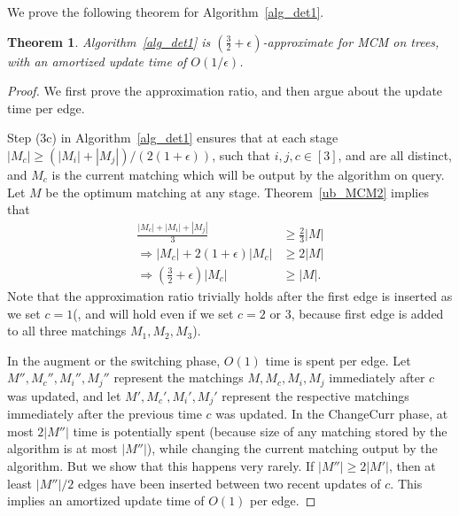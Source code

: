 \documentclass[11pt]{article}
\newtheorem{theorem}{Theorem}
\begin{document}
We prove the following theorem for Algorithm~\ref{alg_det1}.
 \begin{theorem}\label{ub_MCM3}
 Algorithm~\ref{alg_det1} is $\left(\frac{3}{2}+\epsilon\right)$-approximate for MCM on trees, with an amortized update time of $O(1/\epsilon)$.
\end{theorem}
\begin{proof}
 We first prove the approximation ratio, and then argue about the update time per edge.
 
 Step (3c) in Algorithm~\ref{alg_det1} ensures that at each stage $|M_c|\geq \left(|M_i|+|M_j|\right)/(2(1+\epsilon))$, such that $i,j,c \in [3]$, and are all distinct, and $M_c$ is the current matching which will be output by the algorithm on query. Let $M$ be the optimum matching at any stage. Theorem~\ref{ub_MCM2} implies that
 \begin{align*}
 \frac{|M_c|+|M_i|+|M_j|}{3} &\geq \frac{2}{3} |M|\\
 \Longrightarrow |M_c|+2(1+\epsilon)|M_c| &\geq 2|M|\\
 \Longrightarrow\left(\frac{3}{2}+\epsilon\right)|M_c| &\geq |M|.
 \end{align*}
 Note that the approximation ratio trivially holds after the first edge is inserted as we set $c=1$(, and will hold even if we set $c=2$ or $3$, because first edge is added to all three matchings $M_1,M_2,M_3$).
 
 In the augment or the switching phase, $O(1)$ time is spent per edge. Let $M'', M_c'',M_i'',M_j''$ represent the matchings $M,M_c,M_i,M_j$ immediately after $c$ was updated, and  let $M', M_c',M_i',M_j'$ represent the respective matchings immediately after the previous time $c$ was updated. In the ChangeCurr phase, at most $2|M''|$ time is potentially spent (because size of any matching stored by the algorithm is at most $|M''|$), while changing the current matching output by the algorithm. But we show that this happens very rarely. If $|M''|\geq 2|M'|$, then at least $|M''|/2$ edges have been inserted between two recent updates of $c$. This implies an amortized update time of $O(1)$ per edge.
 

\end{proof}
\end{document}
